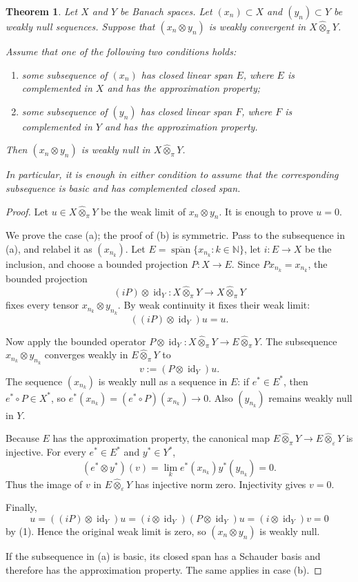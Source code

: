 \documentclass[11pt]{article}
\newtheorem{theorem}{Theorem}
\newcommand{\pten}{\widehat{\otimes}_{\pi}}
\newcommand{\eten}{\widehat{\otimes}_{\varepsilon}}
\begin{document}
\begin{theorem}\label{thm:local-ap}
Let \(X\) and \(Y\) be Banach spaces. Let \((x_n)\subset X\) and \((y_n)\subset Y\) be weakly null sequences. Suppose that \((x_n\otimes y_n)\) is weakly convergent in \(X\pten Y\).

Assume that one of the following two conditions holds:
\begin{enumerate}
\item[(a)] some subsequence of \((x_n)\) has closed linear span \(E\), where \(E\) is complemented in \(X\) and has the approximation property;
\item[(b)] some subsequence of \((y_n)\) has closed linear span \(F\), where \(F\) is complemented in \(Y\) and has the approximation property.
\end{enumerate}
Then \((x_n\otimes y_n)\) is weakly null in \(X\pten Y\).

In particular, it is enough in either condition to assume that the corresponding subsequence is basic and has complemented closed span.
\end{theorem}

\begin{proof}
Let \(u\in X\pten Y\) be the weak limit of \(x_n\otimes y_n\).  It is enough to prove \(u=0\).

We prove the case (a); the proof of (b) is symmetric.  Pass to the subsequence in (a), and relabel it as \((x_{n_k})\).  Let \(E=\overline{\operatorname{span}}\{x_{n_k}:k\in\mathbb N\}\), let \(i:E\to X\) be the inclusion, and choose a bounded projection \(P:X\to E\).  Since \(P x_{n_k}=x_{n_k}\), the bounded projection
\[
  (iP)\otimes \operatorname{id}_Y:X\pten Y\longrightarrow X\pten Y
\]
fixes every tensor \(x_{n_k}\otimes y_{n_k}\).  By weak continuity it fixes their weak limit:
\[
  ((iP)\otimes \operatorname{id}_Y)u=u. \tag{1}
\]

Now apply the bounded operator \(P\otimes \operatorname{id}_Y:X\pten Y\to E\pten Y\).  The subsequence \(x_{n_k}\otimes y_{n_k}\) converges weakly in \(E\pten Y\) to
\[
  v:=(P\otimes \operatorname{id}_Y)u.
\]
The sequence \((x_{n_k})\) is weakly null as a sequence in \(E\): if \(e^*\in E^*\), then \(e^*\circ P\in X^*\), so \(e^*(x_{n_k})=(e^*\circ P)(x_{n_k})\to0\).  Also \((y_{n_k})\) remains weakly null in \(Y\).

Because \(E\) has the approximation property, the canonical map \(E\pten Y\to E\eten Y\) is injective.  For every \(e^*\in E^*\) and \(y^*\in Y^*\),
\[
  (e^*\otimes y^*)(v)
  =
  \lim_k e^*(x_{n_k})y^*(y_{n_k})
  =0.
\]
Thus the image of \(v\) in \(E\eten Y\) has injective norm zero.  Injectivity gives \(v=0\).

Finally,
\[
  u=((iP)\otimes \operatorname{id}_Y)u
   =(i\otimes \operatorname{id}_Y)(P\otimes \operatorname{id}_Y)u
   =(i\otimes \operatorname{id}_Y)v
   =0
\]
by (1).  Hence the original weak limit is zero, so \((x_n\otimes y_n)\) is weakly null.

If the subsequence in (a) is basic, its closed span has a Schauder basis and therefore has the approximation property.  The same applies in case (b).
\end{proof}
\end{document}
